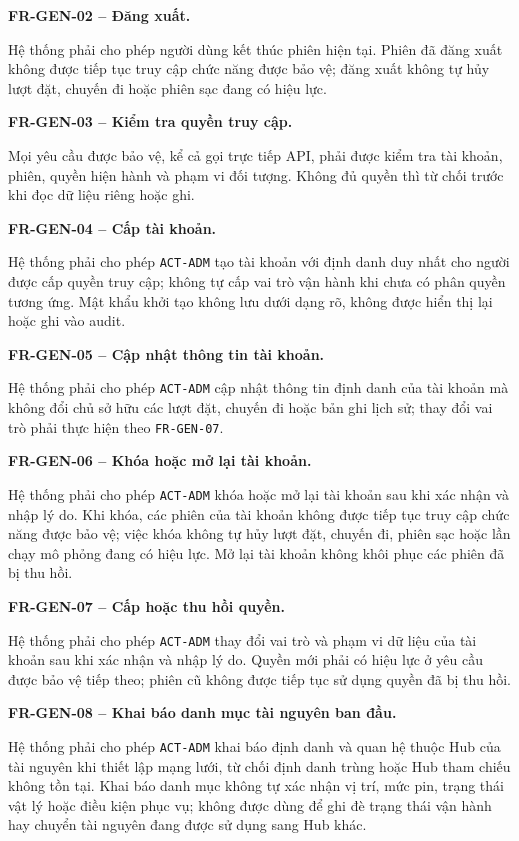 \medskip
\noindent\textbf{FR-GEN-02 -- Đăng xuất.}\par
\nopagebreak[4]
Hệ thống phải cho phép người dùng kết thúc phiên hiện tại. Phiên đã đăng xuất không được tiếp tục truy cập chức năng được bảo vệ; đăng xuất không tự hủy lượt đặt, chuyến đi hoặc phiên sạc đang có hiệu lực.

\medskip
\noindent\textbf{FR-GEN-03 -- Kiểm tra quyền truy cập.}\par
\nopagebreak[4]
Mọi yêu cầu được bảo vệ, kể cả gọi trực tiếp API, phải được kiểm tra tài khoản, phiên, quyền hiện hành và phạm vi đối tượng. Không đủ quyền thì từ chối trước khi đọc dữ liệu riêng hoặc ghi.

\medskip
\noindent\textbf{FR-GEN-04 -- Cấp tài khoản.}\par
\nopagebreak[4]
Hệ thống phải cho phép \texttt{ACT-ADM} tạo tài khoản với định danh duy nhất cho người được cấp quyền truy cập; không tự cấp vai trò vận hành khi chưa có phân quyền tương ứng. Mật khẩu khởi tạo không lưu dưới dạng rõ, không được hiển thị lại hoặc ghi vào audit.

\medskip
\noindent\textbf{FR-GEN-05 -- Cập nhật thông tin tài khoản.}\par
\nopagebreak[4]
Hệ thống phải cho phép \texttt{ACT-ADM} cập nhật thông tin định danh của tài khoản mà không đổi chủ sở hữu các lượt đặt, chuyến đi hoặc bản ghi lịch sử; thay đổi vai trò phải thực hiện theo \texttt{FR-GEN-07}.

\medskip
\noindent\textbf{FR-GEN-06 -- Khóa hoặc mở lại tài khoản.}\par
\nopagebreak[4]
Hệ thống phải cho phép \texttt{ACT-ADM} khóa hoặc mở lại tài khoản sau khi xác nhận và nhập lý do. Khi khóa, các phiên của tài khoản không được tiếp tục truy cập chức năng được bảo vệ; việc khóa không tự hủy lượt đặt, chuyến đi, phiên sạc hoặc lần chạy mô phỏng đang có hiệu lực. Mở lại tài khoản không khôi phục các phiên đã bị thu hồi.

\medskip
\noindent\textbf{FR-GEN-07 -- Cấp hoặc thu hồi quyền.}\par
\nopagebreak[4]
Hệ thống phải cho phép \texttt{ACT-ADM} thay đổi vai trò và phạm vi dữ liệu của tài khoản sau khi xác nhận và nhập lý do. Quyền mới phải có hiệu lực ở yêu cầu được bảo vệ tiếp theo; phiên cũ không được tiếp tục sử dụng quyền đã bị thu hồi.

\medskip
\noindent\textbf{FR-GEN-08 -- Khai báo danh mục tài nguyên ban đầu.}\par
\nopagebreak[4]
Hệ thống phải cho phép \texttt{ACT-ADM} khai báo định danh và quan hệ thuộc Hub của tài nguyên khi thiết lập mạng lưới, từ chối định danh trùng hoặc Hub tham chiếu không tồn tại. Khai báo danh mục không tự xác nhận vị trí, mức pin, trạng thái vật lý hoặc điều kiện phục vụ; không được dùng để ghi đè trạng thái vận hành hay chuyển tài nguyên đang được sử dụng sang Hub khác.

